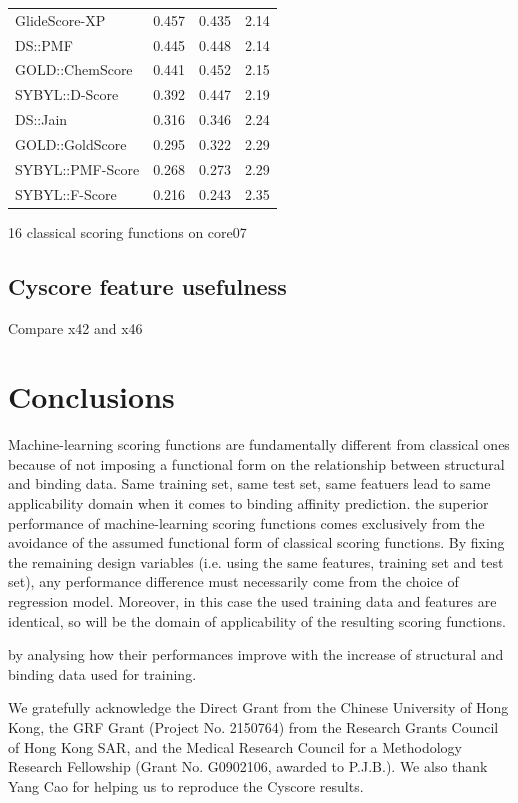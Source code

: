 \documentclass[journal=jacsat,manuscript=article]{achemso}
\begin{document}
\begin{table}
\begin{tabular}{lrrr}
GlideScore-XP & 0.457 & 0.435 & 2.14\\
DS::PMF & 0.445 & 0.448 & 2.14\\
GOLD::ChemScore & 0.441 & 0.452 & 2.15\\
SYBYL::D-Score & 0.392 & 0.447 & 2.19\\
DS::Jain & 0.316 & 0.346 & 2.24\\
GOLD::GoldScore & 0.295 & 0.322 & 2.29\\
SYBYL::PMF-Score & 0.268 & 0.273 & 2.29\\
SYBYL::F-Score & 0.216 & 0.243 & 2.35\\
    \hline
  \end{tabular}
\end{table}

16 classical scoring functions on core07 \cite{1313}

\subsection{Cyscore feature usefulness}

Compare x42 and x46

\section{Conclusions}

Machine-learning scoring functions are fundamentally different from classical ones because of not imposing a functional form on the relationship between structural and binding data.
Same training set, same test set, same featuers lead to same applicability domain when it comes to binding affinity prediction.
the superior performance of machine-learning scoring functions comes exclusively from the avoidance of the assumed functional form of classical scoring functions. By fixing the remaining design variables (i.e. using the same features, training set and test set), any performance difference must necessarily come from the choice of regression model. Moreover, in this case the used training data and features are identical, so will be the domain of applicability of the resulting scoring functions. 

by analysing how their performances improve with the increase of structural and binding data used for training.

\begin{acknowledgement}

We gratefully acknowledge the Direct Grant from the Chinese University of Hong Kong, the GRF Grant (Project No. 2150764) from the Research Grants Council of Hong Kong SAR, and the Medical Research Council for a Methodology Research Fellowship (Grant No. G0902106, awarded to P.J.B.). We also thank Yang Cao for helping us to reproduce the Cyscore results.

\end{acknowledgement}
\end{document}
